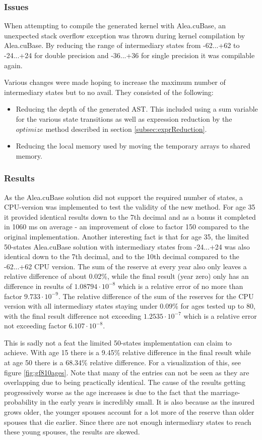 \subsubsection{Issues}
When attempting to compile the generated kernel with Alea.cuBase, an unexpected stack overflow exception was thrown during kernel compilation by Alea.cuBase.
By reducing the range of intermediary states from -62...+62 to -24...+24 for double precision and -36...+36 for single precision it was compilable again.

Various changes were made hoping to increase the maximum number of intermediary states but to no avail.
They consisted of the following:
\begin{itemize}
\item Reducing the depth of the generated AST. This included using a sum variable for the various state transitions as well as expression reduction by the $optimize$ method described in section \ref{subsec:exprReduction}.
\item Reducing the local memory used by moving the temporary arrays to shared memory.
\end{itemize}

\subsubsection{Results}
As the Alea.cuBase solution did not support the required number of states, a CPU-version was implemented to test the validity of the new method.
For age 35 it provided identical results down to the 7th decimal and as a bonus it completed in 1060 ms on average - an improvement of close to factor 150 compared to the original implementation.
Another interesting fact is that for age 35, the limited 50-states Alea.cuBase solution with intermediary states from -24...+24 was also identical down to the 7th decimal, and to the 10th decimal compared to the -62...+62 CPU version.
The sum of the reserve at every year also only leaves a relative difference of about 0.02\%, while the final result (year zero) only has an difference in results of $1.08794 \cdot 10^{-8}$ which is a relative error of no more than factor $9.733 \cdot 10^{-9}$.
The relative difference of the sum of the reserves for the CPU version with all intermediary states staying under 0.09\% for ages tested up to 80, with the final result difference not exceeding $1.2535 \cdot 10^{-7}$ which is a relative error not exceeding factor $6.107 \cdot 10^{-8}$.

This is sadly not a feat the limited 50-states implementation can claim to achieve. 
With age 15 there is a 9.45\% relative difference in the final result while at age 50 there is a 68.34\% relative difference.
For a visualization of this, see figure \ref{fig:gf810ages}. 
Note that many of the entries can not be seen as they are overlapping due to being practically identical.
The cause of the results getting progressively worse as the age increases is due to the fact that the marriage-probability in the early years is incredibly small.
It is also because as the insured grows older, the younger spouses account for a lot more of the reserve than older spouses that die earlier.
Since there are not enough intermediary states to reach these young spouses, the results are skewed.

